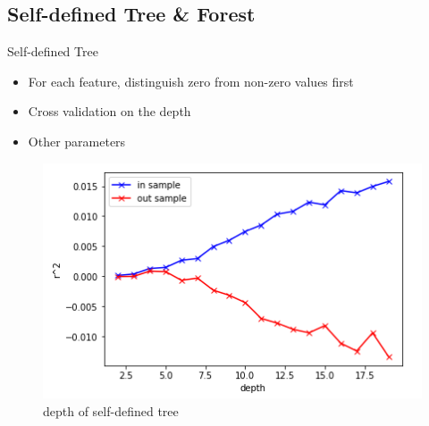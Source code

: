 \documentclass{beamer}
\begin{document}
\subsection{Self-defined Tree \& Forest}
\begin{frame}{Self-defined Tree}
\begin{itemize}
    \item For each feature, distinguish zero from non-zero values first
    \item Cross validation on the depth
    \item Other parameters
\end{itemize}

\begin{figure}[ht]
        \centering
        \includegraphics[width=0.7\linewidth,height=0.4\linewidth]{depth_our_tree.png}
        \caption{depth of self-defined tree}
        \label{fig:label}
    \end{figure}
\end{frame}
\end{document}
